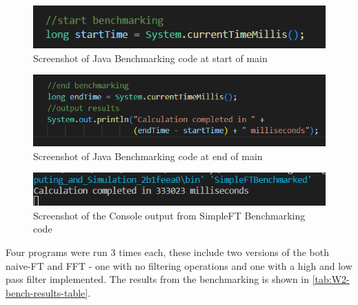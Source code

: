     \begin{figure}[H] 
        \centering
        \includegraphics[width=0.8\columnwidth]{Figures/Week 2/Bench code Start.png}
        \caption{Screenshot of Java Benchmarking code at start of main}
        \label{fig:bench-code-start}
    \end{figure}
    \begin{figure}[H] 
        \centering
        \includegraphics[width=0.8\columnwidth]{Figures/Week 2/Bench code end.png}
        \caption{Screenshot of Java Benchmarking code at end of main}
        \label{fig:bench-code-end}
    \end{figure}
    \begin{figure}[H] 
        \centering
        \includegraphics[width=0.8\columnwidth]{Figures/Week 2/SimpleFT Bench.png}
        \caption{Screenshot of the Console output from SimpleFT Benchmarking code}
        \label{fig:SimpleFT-Bench}
    \end{figure}

    Four programs were run 3 times each, these include two versions of the both naive-FT and FFT - one with no filtering operations and one with a high and low pass filter implemented. The results from the benchmarking is shown in \autoref{tab:W2-bench-results-table}. 
    \begin{table}[htbp]
      \centering
      \caption{Lab 2 FFT Benchmarking Results}
      \label{tab:W2-bench-results-table}
    \end{table}
    
